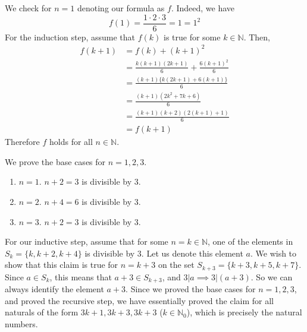 \documentclass{article}
\begin{document}
    \begin{exercise}
      We check for $n = 1$ denoting our formula as $f$. Indeed, we have 
      \begin{equation}
        f(1) = \frac{1 \cdot 2 \cdot 3}{6} = 1 = 1^2
      \end{equation} 
      For the induction step, assume that $f(k)$ is true for some $k \in \mathbb{N}$. Then, 
      \begin{align}
        f(k+1) & = f(k) + (k+1)^2 \\
               & = \frac{k (k + 1) (2k + 1)}{6} + \frac{6 (k+1)^2}{6} \\
               & = \frac{(k+1) \{ k (2k+1) + 6(k+1)\}}{6} \\
               & = \frac{(k+1) (2k^2 + 7k + 6)}{6} \\
               & = \frac{(k+1)(k+2)(2(k+1) + 1)}{6} \\
               & = f(k+1)
      \end{align}
      Therefore $f$ holds for all $n \in \mathbb{N}$. 
    \end{exercise} 

    \begin{exercise}
      We prove the base cases for $n = 1, 2, 3$. 
      \begin{enumerate}
        \item $n = 1$. $n+2 = 3$ is divisible by $3$. 
        \item $n = 2$. $n+4 = 6$ is divisible by $3$. 
        \item $n = 3$. $n+2 = 3$ is divisible by $3$. 
      \end{enumerate} 
      For our inductive step, assume that for some $n = k \in \mathbb{N}$, one of the elements in $S_k = \{k, k+2, k+4\}$ is divisible by $3$. Let us denote this element $a$. We wish to show that this claim is true for $n = k+3$ on the set $S_{k+3} = \{k+3, k+5, k+7\}$. Since $a \in S_k$, this means that $a+3 \in S_{k+3}$, and $3 | a \implies 3 | (a+3)$. So we can always identify the element $a+3$. Since we proved the base cases for $n=1, 2, 3$, and proved the recursive step, we have essentially proved the claim for all naturals of the form $3k+1, 3k+3, 3k+3$ ($k \in \mathbb{N}_0$), which is precisely the natural numbers. 
    \end{exercise}
\end{document}
